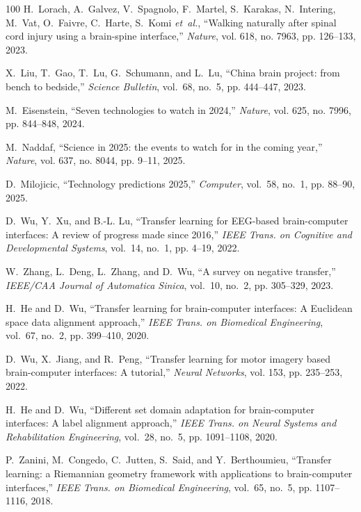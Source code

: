 \documentclass[journal]{IEEEtran}
\begin{document}
\begin{thebibliography}{100}
H.~Lorach, A.~Galvez, V.~Spagnolo, F.~Martel, S.~Karakas, N.~Intering, M.~Vat,
  O.~Faivre, C.~Harte, S.~Komi \emph{et~al.}, ``Walking naturally after spinal
  cord injury using a brain-spine interface,'' \emph{Nature}, vol. 618, no.
  7963, pp. 126--133, 2023.

X.~Liu, T.~Gao, T.~Lu, G.~Schumann, and L.~Lu, ``China brain project: from
  bench to bedside,'' \emph{Science Bulletin}, vol.~68, no.~5, pp. 444--447,
  2023.

M.~Eisenstein, ``Seven technologies to watch in 2024,'' \emph{Nature}, vol.
  625, no. 7996, pp. 844--848, 2024.

M.~Naddaf, ``Science in 2025: the events to watch for in the coming year,''
  \emph{Nature}, vol. 637, no. 8044, pp. 9--11, 2025.

D.~Milojicic, ``Technology predictions 2025,'' \emph{Computer}, vol.~58, no.~1,
  pp. 88--90, 2025.

D.~Wu, Y.~Xu, and B.-L. Lu, ``Transfer learning for {EEG}-based brain-computer
  interfaces: A review of progress made since 2016,'' \emph{IEEE Trans. on
  Cognitive and Developmental Systems}, vol.~14, no.~1, pp. 4--19, 2022.

W.~Zhang, L.~Deng, L.~Zhang, and D.~Wu, ``A survey on negative transfer,''
  \emph{IEEE/CAA Journal of Automatica Sinica}, vol.~10, no.~2, pp. 305--329,
  2023.

H.~He and D.~Wu, ``Transfer learning for brain-computer interfaces: A
  {Euclidean} space data alignment approach,'' \emph{{IEEE} Trans. on
  Biomedical Engineering}, vol.~67, no.~2, pp. 399--410, 2020.

D.~Wu, X.~Jiang, and R.~Peng, ``Transfer learning for motor imagery based
  brain-computer interfaces: A tutorial,'' \emph{Neural Networks}, vol. 153,
  pp. 235--253, 2022.

H.~He and D.~Wu, ``Different set domain adaptation for brain-computer
  interfaces: A label alignment approach,'' \emph{IEEE Trans. on Neural Systems
  and Rehabilitation Engineering}, vol.~28, no.~5, pp. 1091--1108, 2020.

P.~Zanini, M.~Congedo, C.~Jutten, S.~Said, and Y.~Berthoumieu, ``Transfer
  learning: a {R}iemannian geometry framework with applications to
  brain-computer interfaces,'' \emph{{IEEE} Trans. on Biomedical Engineering},
  vol.~65, no.~5, pp. 1107--1116, 2018.


\end{thebibliography}
\end{document}
